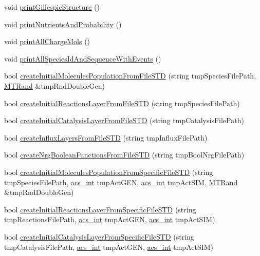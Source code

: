 \begin{DoxyCompactItemize}
\item 
void \hyperlink{a00013_aa3a18c59f6127c642603a98c1b3a2224}{print\+Gillespie\+Structure} ()
\item 
void \hyperlink{a00013_ad8fcefe5325382fb307627c7e8362ba8}{print\+Nutrients\+And\+Probability} ()
\item 
void \hyperlink{a00013_af579052ed051a2e3516218220d238303}{print\+All\+Charge\+Mols} ()
\item 
void \hyperlink{a00013_a3beddfc55f70a9cc855c3e3caaa7f188}{print\+All\+Species\+Id\+And\+Sequence\+With\+Events} ()
\item 
bool \hyperlink{a00013_af6db92c710f2588ba7dff1165e26d538}{create\+Initial\+Molecules\+Population\+From\+File\+S\+T\+D} (string tmp\+Species\+File\+Path, \hyperlink{a00015}{M\+T\+Rand} \&tmp\+Rnd\+Double\+Gen)
\item 
bool \hyperlink{a00013_a2f181e0d3ad1e8062ba0a8c9358ebc58}{create\+Initial\+Reactions\+Layer\+From\+File\+S\+T\+D} (string tmp\+Species\+File\+Path)
\item 
bool \hyperlink{a00013_a29eeb7a1b4689c10fd872e82179b4d84}{create\+Initial\+Catalysis\+Layer\+From\+File\+S\+T\+D} (string tmp\+Catalysis\+File\+Path)
\item 
bool \hyperlink{a00013_a902df40829dad9a885122082ec8fff7a}{create\+Influx\+Layers\+From\+File\+S\+T\+D} (string tmp\+Influx\+File\+Path)
\item 
bool \hyperlink{a00013_abe1a616460ea328067874df715679319}{create\+Nrg\+Boolean\+Functions\+From\+File\+S\+T\+D} (string tmp\+Bool\+Nrg\+File\+Path)
\item 
bool \hyperlink{a00013_ab85fdf18a88fb51afc48eba31d0ed1b2}{create\+Initial\+Molecules\+Population\+From\+Specific\+File\+S\+T\+D} (string tmp\+Species\+File\+Path, \hyperlink{a00050_a8d277355641a098190360234e2ebde35}{acs\+\_\+int} tmp\+Act\+G\+E\+N, \hyperlink{a00050_a8d277355641a098190360234e2ebde35}{acs\+\_\+int} tmp\+Act\+S\+I\+M, \hyperlink{a00015}{M\+T\+Rand} \&tmp\+Rnd\+Double\+Gen)
\item 
bool \hyperlink{a00013_a743956229b11d7860dbc89a18f869586}{create\+Initial\+Reactions\+Layer\+From\+Specific\+File\+S\+T\+D} (string tmp\+Reactions\+File\+Path, \hyperlink{a00050_a8d277355641a098190360234e2ebde35}{acs\+\_\+int} tmp\+Act\+G\+E\+N, \hyperlink{a00050_a8d277355641a098190360234e2ebde35}{acs\+\_\+int} tmp\+Act\+S\+I\+M)
\item 
bool \hyperlink{a00013_a6dd31bae82367ebe7d6a6bb062b8cd07}{create\+Initial\+Catalysis\+Layer\+From\+Specific\+File\+S\+T\+D} (string tmp\+Catalysis\+File\+Path, \hyperlink{a00050_a8d277355641a098190360234e2ebde35}{acs\+\_\+int} tmp\+Act\+G\+E\+N, \hyperlink{a00050_a8d277355641a098190360234e2ebde35}{acs\+\_\+int} tmp\+Act\+S\+I\+M)

\end{DoxyCompactItemize}
